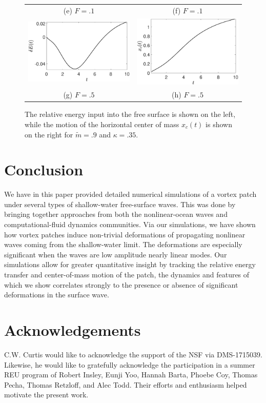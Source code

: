 \documentclass[a4paper,11pt]{article}
\begin{document}
\begin{figure}
\begin{tabular}{cc}
(e) $F=.1$ & (f) $F=.1$\\
 \includegraphics[width=.35\textwidth]{energy_wm_50_modu_pt9} & \includegraphics[width=.35\textwidth]{com_wm_50_modu_pt9}\\
(g) $F=.5$ & (h) $F=.5$
\end{tabular}
\caption{The relative energy input into the free surface is shown on the left, while the motion of the horizontal center of mass $x_{c}(t)$ is shown on the right for $\tilde{m}=.9$ and $\kappa = .35$.}
\label{fig:highsolvorticity}
\end{figure}


\section{Conclusion}
We have in this paper provided detailed numerical simulations of a vortex patch under several types of shallow-water free-surface waves.  This was done by bringing together approaches from both the nonlinear-ocean waves and computational-fluid dynamics communities.  Via our simulations, we have shown how vortex patches induce non-trivial deformations of propagating nonlinear waves coming from the shallow-water limit.  The deformations are especially significant when the waves are low amplitude nearly linear modes.  Our simulations allow for greater quantitative insight by tracking the relative energy transfer and center-of-mass motion of the patch, the dynamics and features of which we show correlates strongly to the presence or absence of significant deformations in the surface wave.  

\section*{Acknowledgements}
C.W. Curtis would like to acknowledge the support of the NSF via DMS-1715039.  Likewise, he would like to gratefully acknowledge the participation in a summer REU program of Robert Insley, Eunji Yoo, Hannah Barta, Phoebe Coy, Thomas Pecha, Thomas Retzloff, and Alec Todd.  Their efforts and enthusiasm helped motivate the present work.    
\end{document}
